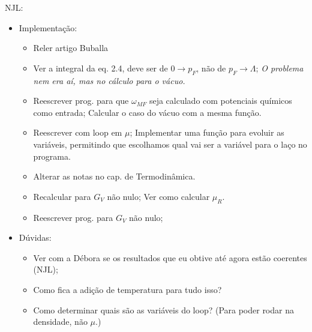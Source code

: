 NJL:
\begin{itemize}
	\item Implementação:
		\begin{itemize}
			\item[\checkmark] Reler artigo Buballa\cite{Buballa1996}
			\item[\checkmark] Ver a integral da eq. 2.4, deve ser de $0 \to p_F$, não de $p_F \to \Lambda$; \textit{O problema nem era aí, mas no cálculo para o vácuo.}
			\item Reescrever prog. para que $\omega_{MF}$ seja calculado com potenciais químicos como entrada; Calcular o caso do vácuo com a mesma função.
			\item Reescrever com loop em $\mu$; Implementar uma função para evoluir as variáveis, permitindo que escolhamos qual vai ser a variável para o laço no programa.
			\item Alterar as notas no cap. de Termodinâmica.
			\item Recalcular para $G_V$ não nulo; Ver como calcular $\mu_R$.
			\item Reescrever prog. para $G_V$ não nulo;
		\end{itemize}
	\item Dúvidas:
		\begin{itemize}
			\item Ver com a Débora se os resultados que eu obtive até agora estão coerentes (NJL);
			\item Como fica a adição de temperatura para tudo isso?
			\item Como determinar quais são as variáveis do loop? (Para poder rodar na densidade, não $\mu$.)
		\end{itemize}
\end{itemize}
